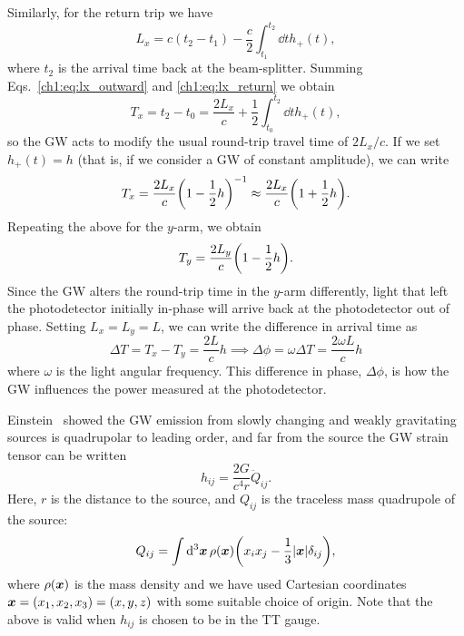 Similarly, for the return trip we have
\begin{equation}\label{ch1:eq:lx_return}
    L_x = c(t_2 - t_1) - \frac{c}{2} \int_{t_1}^{t_2} \dd{t} h_+(t),
\end{equation}
where $t_2$ is the arrival time back at the beam-splitter.
Summing Eqs.~\ref{ch1:eq:lx_outward} and \ref{ch1:eq:lx_return} we obtain
\begin{equation}
    T_x = t_2 - t_0 = \frac{2L_x}{c} + \frac{1}{2}\int_{t_0}^{t_2} \dd{t} h_+(t),
\end{equation}
so the GW acts to modify the usual round-trip travel time of $2L_x/c$.
If we set $h_+(t) = h$ (that is, if we consider a GW of constant amplitude), we can write
\begin{equation}
    T_x = \frac{2L_x}{c}\qty(1-\frac{1}{2}h)^{-1} \approx \frac{2L_x}{c}\qty(1+\frac{1}{2}h).
\end{equation}
Repeating the above for the $y$-arm, we obtain
\begin{equation}
    T_y = \frac{2L_y}{c}\qty(1-\frac{1}{2}h).
\end{equation}
Since the GW alters the round-trip time in the $y$-arm differently, light that left the photodetector initially in-phase will arrive back at the photodetector out of phase.
Setting $L_x = L_y = L$, we can write the difference in arrival time as
\begin{equation}
    \Delta T = T_x - T_y = \frac{2L}{c}h \implies \Delta \phi = \omega \Delta T = \frac{2\omega L}{c}h
\end{equation}
where $\omega$ is the light angular frequency. 
This difference in phase, $\Delta\phi$, is how the GW influences the power measured at the photodetector. 

Einstein~\cite{Einstein:1918btx} showed the GW emission from slowly changing and weakly gravitating sources is quadrupolar to leading order, and far from the source the GW strain tensor can be written
\begin{equation}\label{ch1:eq:quadrupole_strain}
    h_{ij} = \frac{2G}{c^4 r}\ddot{Q}_{ij}.
\end{equation}
Here, $r$ is the distance to the source, and $Q_{ij}$ is the traceless mass quadrupole of the source:
\begin{equation}\label{ch1:eq:quadrupole}
    Q_{ij} = \int \dd[3]{\vb*{x}} \rho(\vb*{x}) \qty(x_i x_j - \frac{1}{3} \abs{\vb*{x}} \delta_{ij}),
\end{equation}
where $\rho(\vb*{x})$ is the mass density and we have used Cartesian coordinates $\vb*{x} = (x_1, x_2, x_3) = (x,y,z)$ with some suitable choice of origin.
Note that the above is valid when $h_{ij}$ is chosen to be in the TT gauge.

